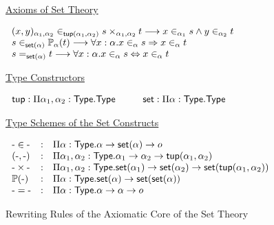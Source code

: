\begin{figure}[t]
\small
\hspace{0.2cm}\underline{Axioms of Set Theory}
\begin{flushleft}
$\begin{array}{@{\hspace{0.2cm}}l}
(x,y)_{\alpha_1,\alpha_2}\in_{\tuple{\alpha_1}{\alpha_2}}s\times_{\alpha_1,\alpha_2}t\rew
x\in_{\alpha_1}s\land{}y\in_{\alpha_2}t\\
s\in_{\set{\alpha}}\mathbb{P}_\alpha(t)\rew
\forall{}x:\alpha.x\in_\alpha{}s\Rightarrow{}x\in_\alpha{}t\\
s=_{\set{\alpha}}t\rew
\forall{}x:\alpha.x\in_\alpha{}s\Leftrightarrow{}x\in_\alpha{}t
\end{array}$
\end{flushleft}
\hspace{0.2cm}\underline{Type Constructors}
\begin{flushleft}
$\begin{array}{@{\hspace{0.2cm}}l@{\hspace{1.0cm}}l}
\mathsf{tup}:\Pi\alpha_1,\alpha_2:\type.\type &
\mathsf{set}:\Pi\alpha:\type.\type
\end{array}$
\end{flushleft}
\hspace{0.2cm}\underline{Type Schemes of the Set Constructs}
\begin{flushleft}
$\begin{array}{@{\hspace{0.2cm}}lcl}
\arg\in\arg & : &
\Pi\alpha:\type.\alpha\rightarrow\set{\alpha}\rightarrow\omicron\\
(\arg,\arg) & : &
\Pi\alpha_1,\alpha_2:\type.\alpha_1\rightarrow\alpha_2\rightarrow
\tuple{\alpha_1}{\alpha_2}\\
\arg\times\arg & : &
\Pi\alpha_1,\alpha_2:\type.\set{\alpha_1}\rightarrow\set{\alpha_2}\rightarrow
\set{\tuple{\alpha_1}{\alpha_2}}\\
\mathbb{P}(\arg) & : &
\Pi\alpha:\type.\set{\alpha}\rightarrow\set{\set{\alpha}}\\
\arg=\arg & : & \Pi\alpha:\type.\alpha\rightarrow\alpha\rightarrow\omicron\\
\end{array}$
\end{flushleft}
\caption{Rewriting Rules of the Axiomatic Core of the \bmth{} Set Theory}
\label{fig:bset}
\end{figure}
